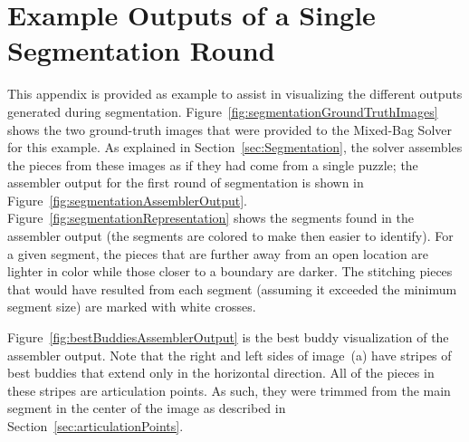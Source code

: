 \chapter{Example Outputs of a Single Segmentation Round\label{app:segmentedOutput}}

This appendix is provided as example to assist in visualizing the different outputs generated during segmentation.  Figure~\ref{fig:segmentationGroundTruthImages} shows the two ground-truth images that were provided to the Mixed-Bag Solver for this example.  As explained in Section~\ref{sec:Segmentation}, the solver assembles the pieces from these images as if they had come from a single puzzle; the assembler output for the first round of segmentation is shown in Figure~\ref{fig:segmentationAssemblerOutput}.  Figure~\ref{fig:segmentationRepresentation} shows the segments found in the assembler output (the segments are colored to make then easier to identify).  For a given segment, the pieces that are further away from an open location are lighter in color while those closer to a boundary are darker.  The stitching pieces that would have resulted from each segment (assuming it exceeded the minimum segment size) are marked with white crosses.

Figure~\ref{fig:bestBuddiesAssemblerOutput} is the best buddy visualization of the assembler output.  Note that the right and left sides of image~(a) have stripes of best buddies that extend only in the horizontal direction.  All of the pieces in these stripes are articulation points.  As such, they were trimmed from the main segment in the center of the image as described in Section~\ref{sec:articulationPoints}.

